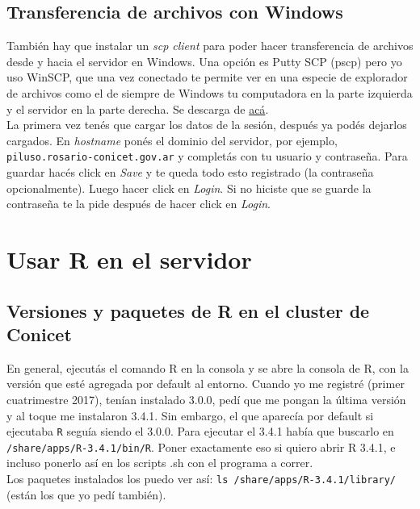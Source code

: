 \documentclass[paper=a4, fontsize=11pt]{article} %
\numberwithin{equation}{section} %
\numberwithin{figure}{section} %
\numberwithin{table}{section} %
\begin{document}
\subsection{Transferencia de archivos con Windows}

También hay que instalar un \textit{scp client} para poder hacer transferencia de archivos desde y hacia el servidor en Windows. Una opción es Putty SCP (pscp) pero yo uso WinSCP, que una vez conectado te permite ver en una especie de explorador de archivos como el de siempre de Windows tu computadora en la parte izquierda y el servidor en la parte derecha. Se descarga de \href{https://winscp.net/eng/download.php}{acá}.\\

La primera vez tenés que cargar los datos de la sesión, después ya podés dejarlos cargados. En \textit{hostname} ponés el dominio del servidor, por ejemplo, \texttt{piluso.rosario-conicet.gov.ar} y completás con tu usuario y contraseña. Para guardar hacés click en \textit{Save} y te queda todo esto registrado (la contraseña opcionalmente). Luego hacer click en \textit{Login}.  Si no hiciste que se guarde la contraseña te la pide después de hacer click en \textit{Login}.

\section{Usar R en el servidor}

\subsection{Versiones y paquetes de R en el cluster de Conicet}

En general, ejecutás el comando R en la consola y se abre la consola de R, con la versión que esté agregada por default al entorno. Cuando yo me registré (primer cuatrimestre 2017), tenían instalado 3.0.0, pedí que me pongan la última versión y al toque me instalaron 3.4.1. Sin embargo, el que aparecía por default si ejecutaba \texttt{R} seguía siendo el 3.0.0. Para ejecutar el 3.4.1 había que buscarlo en \texttt{/share/apps/R-3.4.1/bin/R}. Poner exactamente eso si quiero abrir R 3.4.1, e incluso ponerlo así en los scripts .sh con el programa a correr.\\

Los paquetes instalados los puedo ver así: \texttt{ls /share/apps/R-3.4.1/library/} (están los que yo pedí también).\\
\end{document}
